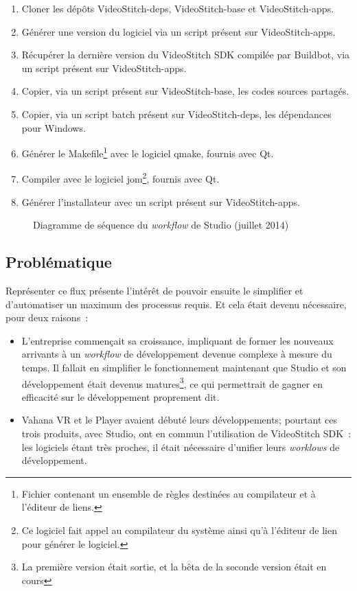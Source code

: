 \begin{enumerate}
  \item Cloner les dépôts VideoStitch-deps, VideoStitch-base et VideoStitch-apps.
  \item Générer une version du logiciel via un script présent sur VideoStitch-apps.
  \item Récupérer la dernière version du VideoStitch SDK compilée par Buildbot, 
  via un script présent sur VideoStitch-apps.
  \item Copier, via un script présent sur VideoStitch-base, les codes sources partagés.
  \item Copier, via un script batch présent sur VideoStitch-deps, les dépendances pour Windows.
  \item Générer le Makefile\footnote{Fichier contenant un ensemble de règles destinées
  au compilateur et à l'éditeur de liens.} avec le logiciel qmake, fournis avec Qt.
  \item Compiler avec le logiciel jom\footnote{Ce logiciel fait appel au compilateur 
  du système ainsi qu'à l'éditeur de lien pour générer le logiciel.}, fournis avec Qt.
  \item Générer l'installateur avec un script présent sur VideoStitch-apps.
\end{enumerate}
\begin{figure}
  \centering
  \caption{Diagramme de séquence du \textit{workflow} de Studio (juillet 2014)}
	\label{workflow-studio}
\end{figure}
  
\subsection{Problématique}
Représenter ce flux présente l'intérêt de pouvoir ensuite le simplifier et d'automatiser
un maximum des processus requis. Et cela était devenu nécessaire, pour deux raisons~:
\begin{itemize}
  \item L'entreprise commençait sa croissance, impliquant de former les nouveaux arrivants
  à un \textit{workflow} de développement devenue complexe à mesure du temps. Il fallait en
  simplifier le fonctionnement maintenant que Studio et son développement était
  devenus matures\footnote{La première version était sortie, et la bêta de la seconde
  version était en cours}, ce qui permettrait de gagner en efficacité sur le développement
  proprement dit.
  \item Vahana VR et le Player avaient débuté leurs développements; pourtant ces trois
  produits, avec Studio, ont en commun l'utilisation de VideoStitch SDK~: les logiciels
  étant très proches, il était nécessaire d'unifier leurs \textit{worklows} de développement.
\end{itemize}

